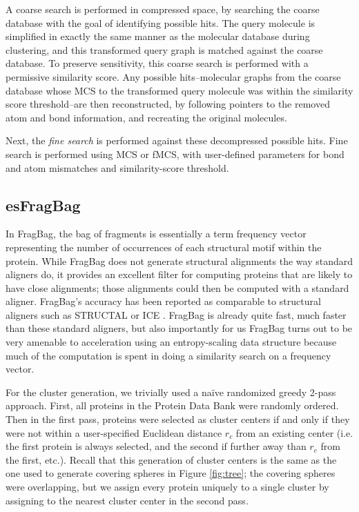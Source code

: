 \documentclass[review,preprint,12pt]{elsarticle}
\renewcommand{\cite}{\citep} %
\theoremstyle{definition}
\theoremstyle{remark}
\numberwithin{equation}{section}
\begin{document}
A coarse search is performed in compressed space, by searching 
the coarse database with the goal of identifying possible hits.
The query molecule is simplified in exactly the same manner as 
the molecular database during clustering, and this transformed query graph is 
matched against the coarse database.
To preserve sensitivity, this coarse search is performed with a permissive 
similarity score.
Any possible hits--molecular graphs from the coarse database whose MCS to 
the transformed query molecule was within the similarity score threshold--are 
then reconstructed, by following
pointers to the removed atom and bond information, and recreating the 
original molecules.

Next, the \emph{fine search} is performed against these decompressed possible 
hits.
Fine search is performed using MCS or fMCS, with user-defined parameters for 
bond and atom mismatches and similarity-score threshold.


\subsection{esFragBag}
In FragBag, the bag of fragments is essentially
a term frequency vector representing the number of occurrences of each structural motif within the protein.
While FragBag does not generate structural alignments the way standard aligners do, it provides an excellent
filter for computing proteins that are likely to have close alignments; those alignments could then be computed
with a standard aligner.
FragBag's accuracy has been reported as comparable to structural aligners such as
 STRUCTAL \cite{subbiah1993structural} or ICE \cite{shindyalov1998protein}.
FragBag is already quite fast, much faster than these standard aligners, but also importantly for us
FragBag turns out to be very amenable to acceleration using an entropy-scaling data structure because much of the computation is spent in doing a similarity search on a frequency vector.

For the cluster generation, we trivially used a na\"ive randomized greedy 2-pass approach.
First, all proteins in the Protein Data Bank were randomly ordered.
Then in the first pass, proteins were selected as cluster centers if and only if they were not within a user-specified Euclidean distance $r_c$ from an existing center (i.e. the first protein is always selected, and the second if further away than $r_c$ from the first, etc.).
Recall that this generation of cluster centers is the same as the one used to generate covering spheres in Figure \ref{fig:tree};
the covering spheres were overlapping, but we assign every protein uniquely to a single cluster by assigning to the nearest cluster center in the second pass.
\end{document}
